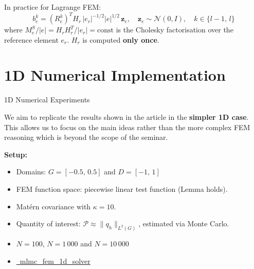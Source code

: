 \documentclass[
  english,            %
  aspectratio=169,    %
]{tumbeamer}
\begin{document}
\begin{frame}


\bigskip
In practice for Lagrange FEM:
\begin{equation}
  b_e^k = (R_e^k)^T H_r\, |e_r|^{-1/2} |e|^{1/2}\, \mathbf{z}_e,
  \quad \mathbf{z}_e \sim \mathcal{N}(0,I),\quad k \in \{l-1,\,l\}
\end{equation}
where $M_e^S / |e| = H_r H_r^T / |e_r| = \mathrm{const}$ is the Cholesky factorisation
over the reference element $e_r$. $H_r$ is computed \textbf{only once}.

\end{frame}

\section{1D Numerical Implementation}

\begin{frame}{1D Numerical Experiments}

We aim to replicate the results shown in the article in the \textbf{simpler 1D case}. This
allows us to focus on the main ideas rather than the more complex FEM reasoning which is
beyond the scope of the seminar.

\bigskip
\textbf{Setup:}
\begin{itemize}
  \item Domains: $G = [-0.5,\,0.5]$ and $ D = [-1,\,1]$
  \item FEM function space: piecewise linear test function (Lemma holds).
  \item Mat\'ern covariance with $\kappa=10$.
  \item Quantity of interest: $\mathcal{P} \approx \|q_h\|_{L^2(G)}$, estimated
    via Monte Carlo.
  \item $N = 100$, $N = 1\,000$ and  $N = 10\,000$ 
  \item \href{https://github.com/fede-mat/mlmc_fem_1d_solver}{\faGithub\ mlmc\_fem\_1d\_solver}
\end{itemize}

\end{frame}
\end{document}
